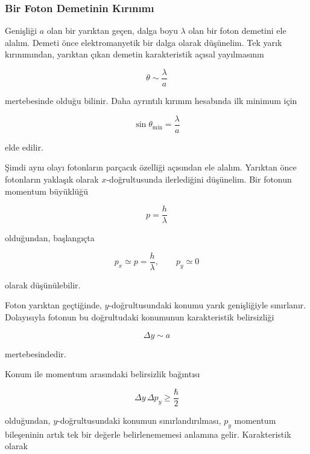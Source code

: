 \documentclass[00_kitap.tex]{subfiles}
\begin{document}
	\BolumKaynakcaBaslat

\subsubsection{Bir Foton Demetinin Kırınımı}

Genişliği \(a\) olan bir yarıktan geçen, dalga boyu \(\lambda\) olan
bir foton demetini ele alalım. Demeti önce elektromanyetik bir dalga
olarak düşünelim. Tek yarık kırınımından, yarıktan çıkan demetin
karakteristik açısal yayılmasının

\begin{equation}
	\theta \sim \frac{\lambda}{a}
\end{equation}

mertebesinde olduğu bilinir. Daha ayrıntılı kırınım hesabında ilk
minimum için

\begin{equation}
	\sin\theta_{\min}=\frac{\lambda}{a}
\end{equation}

elde edilir.

Şimdi aynı olayı fotonların parçacık özelliği açısından ele alalım.
Yarıktan önce fotonların yaklaşık olarak \(x\)-doğrultusunda ilerlediğini
düşünelim. Bir fotonun momentum büyüklüğü

\begin{equation}
	p=\frac{h}{\lambda}
\end{equation}

olduğundan, başlangıçta

\begin{equation}
	p_x\simeq p=\frac{h}{\lambda},
	\qquad
	p_y\simeq 0
\end{equation}

olarak düşünülebilir.

Foton yarıktan geçtiğinde, \(y\)-doğrultusundaki konumu yarık
genişliğiyle sınırlanır. Dolayısıyla fotonun bu doğrultudaki konumunun
karakteristik belirsizliği

\begin{equation}
	\Delta y \sim a
\end{equation}

mertebesindedir.

Konum ile momentum arasındaki belirsizlik bağıntısı

\begin{equation}
	\Delta y\,\Delta p_y
	\geq
	\frac{\hbar}{2}
\end{equation}

olduğundan, \(y\)-doğrultusundaki konumun sınırlandırılması,
\(p_y\) momentum bileşeninin artık tek bir değerle belirlenememesi
anlamına gelir. Karakteristik olarak
\end{document}
